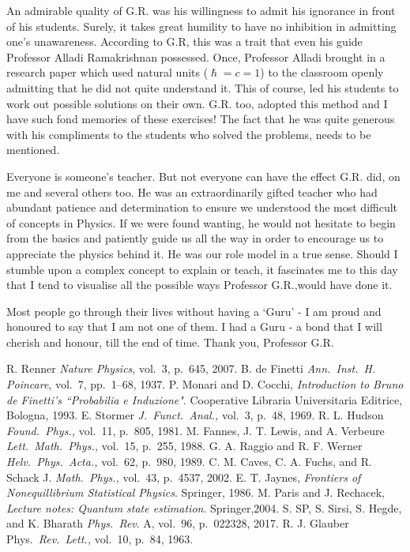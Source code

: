 An admirable quality of G.R. was his willingness to admit his ignorance in front of
his students. Surely, it takes great humility to have no inhibition in admitting one’s
unawareness. According to G.R, this was a trait that even his guide Professor Alladi
Ramakrishnan possessed. Once, Professor Alladi brought in a research paper which
used natural units ($\hslash = c = 1$) to the classroom openly admitting that he did not quite
understand it. This of course, led his students to work out possible solutions on their
own. G.R. too, adopted this method and I have such fond memories of these exercises!
The fact that he was quite generous with his compliments to the students who solved
the problems, needs to be mentioned.


Everyone is someone's teacher. But not everyone can have the effect G.R. did, on
me and several others too. He was an extraordinarily gifted teacher who had abundant
patience and determination to ensure we understood the most difficult of concepts in
Physics. If we were found wanting, he would not hesitate to begin from the basics and
patiently guide us all the way in order to encourage us to appreciate the physics behind
it. He was our role model in a true sense. Should I stumble upon a complex concept
to explain or teach, it fascinates me to this day that I tend to visualise all the possible
ways Professor G.R.,would have done it.


Most people go through their lives without having a ‘Guru’ - I am proud and honoured to say that I am not one of them. I had a Guru - a bond that I will cherish and
honour, till the end of time. Thank you, Professor G.R.


\begin{thebibliography}{99}
 R. Renner \textit{Nature Physics}, vol.\ 3, p.\ 645, 2007.
 B. de Finetti \textit{Ann.\ Inst.\ H. Poincare}, vol.\ 7, pp.\ 1--68, 1937.
 P. Monari and D. Cocchi, \textit{Introduction to Bruno de Finetti's ``Probabilia e Induzione"}. Cooperative Libraria Universitaria Editrice, Bologna, 1993.
 E. Stormer \textit{J.\ Funct.\ Anal.,} vol.\ 3, p.\ 48, 1969.
 R. L. Hudson \textit{Found.\ Phys.,} vol.\ 11, p.\ 805, 1981.
 M. Fannes, J. T. Lewis, and A. Verbeure \textit{Lett.\ Math.\ Phys.,} vol.\ 15, p.\ 255, 1988.
 G. A. Raggio and R. F. Werner \textit{Helv.\ Phys.\ Acta.,} vol.\ 62, p.\ 980, 1989.
 C. M. Caves, C. A. Fuchs, and R. Schack J. \textit{Math.\ Phys.,} vol.\ 43, p.\ 4537, 2002.
 E. T. Jaynes, \textit{Frontiers of Nonequillibrium Statistical Physics}. Springer, 1986.
 M. Paris and J. Rechacek, \textit{Lecture notes: Quantum state estimation}. Springer,2004.
 S. SP, S. Sirsi, S. Hegde, and K. Bharath \textit{Phys.\ Rev}. A, vol.\ 96, p.\ 022328, 2017.
 R. J. Glauber Phys.\ \textit{Rev.\ Lett.,} vol.\ 10, p.\ 84, 1963.
\end{thebibliography}


